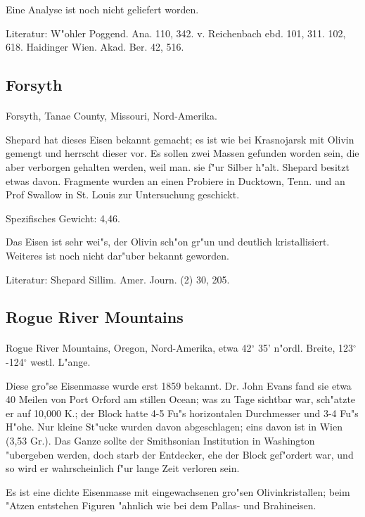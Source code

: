 \documentclass[a4paper, 11pt, oneside]{article}
\begin{document}
Eine Analyse ist noch nicht geliefert worden.

\footnotesize
Literatur: W"ohler Poggend. Ana. 110, 342. v. Reichenbach ebd. 101, 311. 102, 618. Haidinger Wien. Akad. Ber. 42, 516.

\subsection{Forsyth}
\normalsize
\paragraph{}
Forsyth, Tanae County, Missouri, Nord-Amerika.

Shepard hat dieses Eisen bekannt gemacht; es ist wie bei Krasnojarsk mit Olivin gemengt und herrscht dieser vor. Es sollen zwei Massen gefunden worden sein, die aber verborgen gehalten werden, weil man. sie f"ur Silber h"alt. Shepard besitzt etwas davon. Fragmente wurden an einen Probiere in Ducktown, Tenn. und an Prof Swallow in St. Louis zur Untersuchung geschickt.

Spezifisches Gewicht: 4,46.

Das Eisen ist sehr wei"s, der Olivin sch"on gr"un und deutlich kristallisiert. Weiteres ist noch nicht dar"uber bekannt geworden.

\footnotesize
Literatur: Shepard Sillim. Amer. Journ. (2) 30, 205.

\subsection{Rogue River Mountains}
\normalsize
\paragraph{}
Rogue River Mountains, Oregon, Nord-Amerika, etwa 42$^\circ$ 35' n"ordl. Breite, 123$^\circ$-124$^\circ$ westl. L"ange.

Diese gro"se Eisenmasse wurde erst 1859 bekannt. Dr. John Evans fand sie etwa 40 Meilen von Port Orford am stillen Ocean; was zu Tage sichtbar war, sch"atzte er auf 10,000 K.; der Block hatte 4-5 Fu"s horizontalen Durchmesser und 3-4 Fu"s H"ohe. Nur kleine St"ucke wurden davon abgeschlagen; eins davon ist in Wien (3,53 Gr.). Das Ganze sollte der Smithsonian Institution in Washington "ubergeben werden, doch starb der Entdecker, ehe der Block gef"ordert war, und so wird er wahrscheinlich f"ur lange Zeit verloren sein.

Es ist eine dichte Eisenmasse mit eingewachsenen gro"sen Olivinkristallen; beim "Atzen entstehen Figuren "ahnlich wie bei dem Pallas- und Brahineisen.
\end{document}
